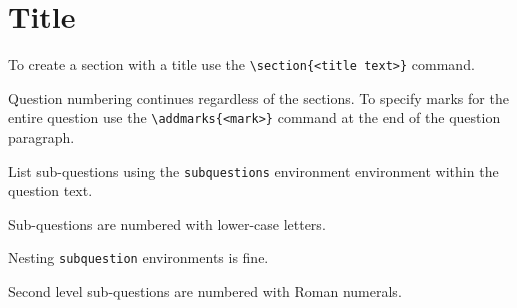 \documentclass[answers]{otagoexam}
\begin{document}
\section{Title}

To create a section with a title use the \verb$\section{<title text>}$ command.

\begin{question}

    Question numbering continues regardless of the sections.  To specify marks for the entire question use the \texttt{\textbackslash addmarks\{<mark>\}} command at the end of the question paragraph.

    \begin{subquestions}
        \item List sub-questions using the \texttt{subquestions} environment environment within the question text.
        \item Sub-questions are numbered with lower-case letters.

        \item{
            \begin{subquestions}
                \item Nesting \texttt{subquestion} environments is fine.
                \item Second level sub-questions are numbered with Roman numerals.
            \end{subquestions}
        }
        
    \end{subquestions}
\end{question}
\end{document}
